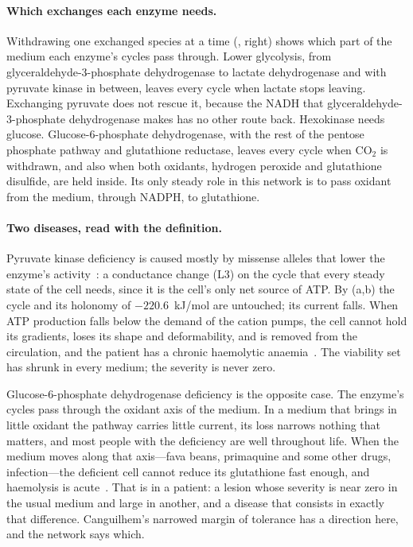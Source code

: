 \paragraph{Which exchanges each enzyme needs.} \lnkC{} Withdrawing one
exchanged species at a time (, right) shows which part of
the medium each enzyme's cycles pass through. Lower glycolysis, from
glyceraldehyde-3-phosphate dehydrogenase to lactate dehydrogenase and with
pyruvate kinase in between, leaves every cycle when lactate stops leaving.
Exchanging pyruvate does not rescue it, because the NADH that
glyceraldehyde-3-phosphate dehydrogenase makes has no other route back.
Hexokinase needs glucose. Glucose-6-phosphate dehydrogenase, with the rest
of the pentose phosphate pathway and glutathione reductase, leaves every
cycle when CO$_2$ is withdrawn, and also when both oxidants, hydrogen
peroxide and glutathione disulfide, are held inside. Its only steady role in
this network is to pass oxidant from the medium, through NADPH, to
glutathione.

\paragraph{Two diseases, read with the definition.} \lnkS\lnkD{} Pyruvate
kinase deficiency is caused mostly by missense alleles that lower the
enzyme's activity~\citep{zanella2005}: a conductance change (L3) on the
cycle that every steady state of the cell needs, since it is the cell's only
net source of ATP. By (a,b) the cycle and its holonomy
of $-220.6$~kJ/mol are untouched; its current falls. When ATP production
falls below the demand of the cation pumps, the cell cannot hold its
gradients, loses its shape and deformability, and is removed from the
circulation, and the patient has a chronic haemolytic
anaemia~\citep{zanella2005,grace2018}. The viability set has shrunk in every
medium; the severity is never zero.

Glucose-6-phosphate dehydrogenase deficiency is the opposite case. The
enzyme's cycles pass through the oxidant axis of the medium. In a medium
that brings in little oxidant the pathway carries little current, its loss
narrows nothing that matters, and most people with the deficiency are well
throughout life. When the medium moves along that axis---fava beans,
primaquine and some other drugs, infection---the deficient cell cannot
reduce its glutathione fast enough, and haemolysis is
acute~\citep{luzzatto2020}. That is  in a patient: a
lesion whose severity is near zero in the usual medium and large in another,
and a disease that consists in exactly that difference. Canguilhem's
narrowed margin of tolerance has a direction here, and the network says
which.

